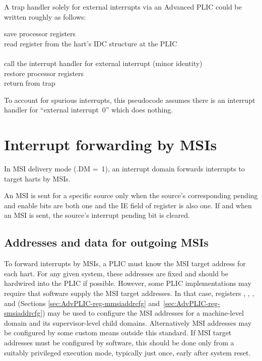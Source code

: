A trap handler solely for external interrupts via an Advanced PLIC
could be written roughly as follows:

\begin{displayLinesTable}
save processor registers \\
read register  from the hart's IDC structure at the PLIC \\
 \\
call the interrupt handler for external interrupt  (minor identity) \\
restore processor registers \\
return from trap \\
\end{displayLinesTable}
To account for spurious interrupts, this pseudocode assumes there is an
interrupt handler for ``external interrupt~0'' which does nothing.

\section{Interrupt forwarding by MSIs}

In MSI delivery mode (.DM =~1), an interrupt domain
forwards interrupts to target harts by MSIs.

An MSI is sent for a specific source only when the source's
corresponding pending and enable bits are both one and the IE field of
register  is also one.
If and when an MSI is sent, the source's interrupt pending bit is
cleared.

\subsection{Addresses and data for outgoing MSIs}
\label{sec:AdvPLIC-MSIAddrs}

To forward interrupts by MSIs, a PLIC must know the MSI target address
for each hart.
For any given system, these addresses are fixed and should be hardwired
into the PLIC if possible.
However, some PLIC implementations may require that software supply the
MSI target addresses.
In that case, registers ,
, , and 
(Sections \ref{sec:AdvPLIC-reg-mmsiaddrcfg}
and~\ref{sec:AdvPLIC-reg-smsiaddrcfg}) may be used to configure the
MSI addresses for a machine-level domain and its supervisor-level child
domains.
Alternatively MSI addresses may be configured by some custom means
outside this standard.
If MSI target addresses must be configured by software, this should
be done only from a suitably privileged execution mode, typically just
once, early after system reset.

